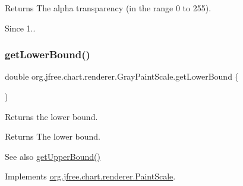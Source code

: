 \begin{DoxyReturn}{Returns}
The alpha transparency (in the range 0 to 255).
\end{DoxyReturn}
\begin{DoxySince}{Since}
1.. 
\end{DoxySince}
\mbox{\label{classorg_1_1jfree_1_1chart_1_1renderer_1_1_gray_paint_scale_aa66a8fc46c5cf10fd357d677e93ec48f}} 
\subsubsection{\texorpdfstring{get\+Lower\+Bound()}{getLowerBound()}}
{\footnotesize\ttfamily double org.\+jfree.\+chart.\+renderer.\+Gray\+Paint\+Scale.\+get\+Lower\+Bound (\begin{DoxyParamCaption}{ }\end{DoxyParamCaption})}

Returns the lower bound.

\begin{DoxyReturn}{Returns}
The lower bound.
\end{DoxyReturn}
\begin{DoxySeeAlso}{See also}
\mbox{\hyperlink{classorg_1_1jfree_1_1chart_1_1renderer_1_1_gray_paint_scale_a5420a928eca3df6dc07e2400ff89cab9}{get\+Upper\+Bound()}} 
\end{DoxySeeAlso}


Implements \mbox{\hyperlink{interfaceorg_1_1jfree_1_1chart_1_1renderer_1_1_paint_scale_a125f1d305abf1f3764b62f5a9c5fabbd}{org.\+jfree.\+chart.\+renderer.\+Paint\+Scale}}.

\mbox{\label{classorg_1_1jfree_1_1chart_1_1renderer_1_1_gray_paint_scale_af4b201fbb96918235cc5e92bd5815910}} 
